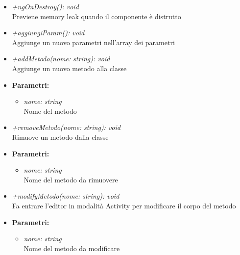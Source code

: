 \begin{itemize}
\begin{itemize}
            			\item \emph{+ngOnDestroy(): void}\\
            			Previene memory leak quando il componente è distrutto
            			\item \emph{+aggiungiParam(): void}\\
            			Aggiunge un nuovo parametri nell'array dei parametri
            			\item \emph{+addMetodo(nome: string): void}\\
            			Aggiunge un nuovo metodo alla classe
            			\item \textbf{Parametri:}\\
            				\begin{itemize}
            					\item \emph{nome: string}\\
            					Nome del metodo
            				\end{itemize}
            			\item \emph{+removeMetodo(nome: string): void}\\
            			Rimuove un metodo dalla classe
            			\item \textbf{Parametri:}\\
            				\begin{itemize}
            					\item \emph{nome: string}\\
            					Nome del metodo da rimuovere
            				\end{itemize}
            			\item \emph{+modifyMetodo(nome: string): void}\\
            			Fa entrare l'editor in modalità Activity per modificare il corpo del metodo
            			\item \textbf{Parametri:}\\
            				\begin{itemize}
            					\item \emph{nome: string}\\
            					Nome del metodo da modificare
            				\end{itemize}
          			\end{itemize}
          		\end{itemize}
